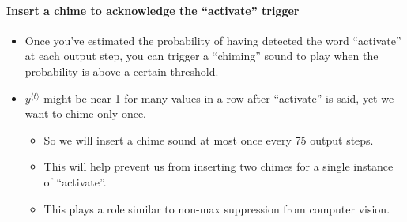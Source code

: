 \documentclass[11pt]{article}
\begin{document}
    \paragraph{Insert a chime to acknowledge the ``activate''
trigger}\label{insert-a-chime-to-acknowledge-the-activate-trigger}

\begin{itemize}
\itemsep1pt\parskip0pt
\item
  Once you've estimated the probability of having detected the word
  ``activate'' at each output step, you can trigger a ``chiming'' sound
  to play when the probability is above a certain threshold.
\item
  $y^{\langle t \rangle}$ might be near 1 for many values in a row after
  ``activate'' is said, yet we want to chime only once.

  \begin{itemize}
  \itemsep1pt\parskip0pt
  \item
    So we will insert a chime sound at most once every 75 output steps.
  \item
    This will help prevent us from inserting two chimes for a single
    instance of ``activate''.
  \item
    This plays a role similar to non-max suppression from computer
    vision.
  \end{itemize}
\end{itemize}
\end{document}
